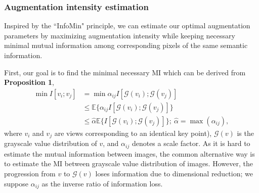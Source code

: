 \documentclass[10pt,twocolumn,letterpaper]{article}
\begin{document}
\subsubsection{Augmentation intensity estimation}
Inspired by the ``InfoMin" principle, we can estimate our optimal augmentation parameters by maximizing augmentation intensity while keeping necessary minimal mutual information among corresponding pixels of the same semantic information.  

First, our goal is to find the minimal necessary MI which can be derived from \textbf{Proposition 1}, 
\begin{equation}
\begin{aligned}
    \min I[v_i; v_j] &= \min \alpha_{ij} I[\mathcal{G}(v_i); \mathcal{G}(v_j)] \\
    &\leq \mathbb{E} \{\alpha_{ij} I[\mathcal{G}(v_i); \mathcal{G}(v_j)]\} \\
    &\leq \hat{\alpha} \mathbb{E} \{I[\mathcal{G}(v_i); \mathcal{G}(v_j)]\};~ \hat{\alpha}=\max(\alpha_{ij}),
\end{aligned}
\end{equation}
where $v_i$ and $v_j$ are views corresponding to an identical key point), $\mathcal{G}(v)$ is the grayscale value distribution of $v$, and $\alpha_{ij}$ denotes a scale factor. As it is hard to estimate the mutual information between images, the common alternative way is to estimate the MI between grayscale value distribution of images. However, the progression from $v$ to $\mathcal{G}(v)$ loses information due to dimensional reduction; we suppose $\alpha_{ij}$ as the inverse ratio of information loss.  
\end{document}

